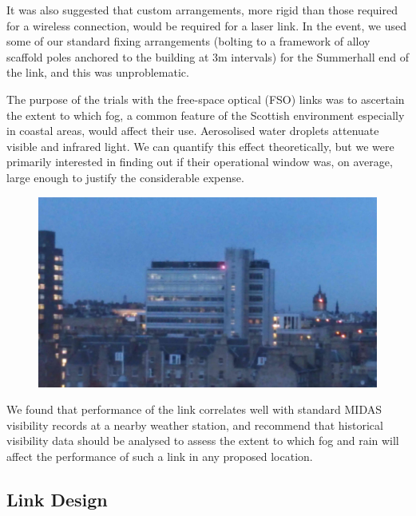 \documentclass{amsart}
\begin{document}
It was also suggested that custom arrangements, more rigid than those
required for a wireless connection, would be required for a laser
link. In the event, we used some of our standard fixing arrangements
(bolting to a framework of alloy scaffold poles anchored to the
building at 3m intervals) for the Summerhall end of the link, and this
was unproblematic.

The purpose of the trials with the free-space optical (FSO) links was to
ascertain the extent to which fog, a common feature of the Scottish
environment especially in coastal areas, would affect their
use. Aerosolised water droplets attenuate visible and infrared
light. We can quantify this effect theoretically, but we were
primarily interested in finding out if their operational window was,
on average, large enough to justify the considerable expense.
\begin{figure}
  \includegraphics[width=\textwidth]{at-laser-s.jpg}
\end{figure}

We found that performance of the link correlates well with standard
MIDAS visibility records at a nearby weather station, and recommend
that historical visibility data should be analysed to assess the extent
to which fog and rain will affect the performance of such a link in
any proposed location.

\subsection{Link Design}
\label{sec:link-design}
\end{document}
